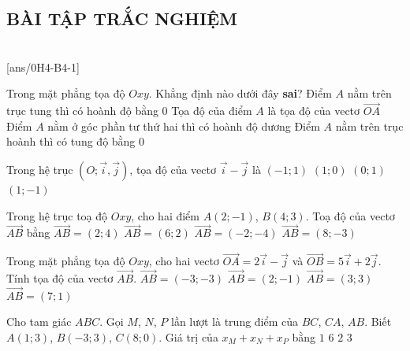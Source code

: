 \subsection{BÀI TẬP TRẮC NGHIỆM}
 \\
\setcounter{ex}{0}
[ans/0H4-B4-1]

\begin{ex}%
	Trong mặt phẳng tọa độ $Oxy$. Khẳng định nào dưới đây \textbf{sai}?
	\choice
	{Điểm $A$ nằm trên trục tung thì có hoành độ bằng 0}
	{Tọa độ của điểm $A$ là tọa độ của vectơ $\overrightarrow{OA}$}
	{\True Điểm $A$ nằm ở góc phần tư thứ hai thì có hoành độ dương}
	{Điểm $A$ nằm trên trục hoành thì có tung độ bằng 0}
\end{ex}

\begin{ex}%
	Trong hệ trục $(O; \overrightarrow{i}, \overrightarrow{j})$, tọa độ của vectơ $\overrightarrow{i} -\overrightarrow{j}$ là
	\choice
	{$(-1;1)$}
	{$(1;0)$}
	{$(0;1)$}
	{\True $(1;-1)$}
\end{ex}

\begin{ex}%
	Trong hệ trục toạ độ $Oxy$, cho hai điểm $A(2;-1)$, $B(4;3)$. Toạ độ của vectơ $\overrightarrow{AB}$ bằng
	\choice
	{\True $\overrightarrow{AB}=(2;4)$}
	{$\overrightarrow{AB}=(6;2)$}
	{$\overrightarrow{AB}=(-2;-4)$}
	{$\overrightarrow{AB}=(8;-3)$}
\end{ex}

\begin{ex}%
	Trong mặt phẳng tọa độ $Oxy$, cho hai vectơ $\overrightarrow{OA} =2\overrightarrow{i} -\overrightarrow{j}$ và $\overrightarrow{OB} =5\overrightarrow{i} +2\overrightarrow{j}$. Tính tọa độ của vectơ $\overrightarrow{AB}$.
	\choice
	{$\overrightarrow{AB} =(-3;-3) $}
	{$\overrightarrow{AB} =(2;-1) $}
	{\True $\overrightarrow{AB} =(3;3)$}
	{$\overrightarrow{AB} =(7;1)$}
\end{ex}

\begin{ex}%
	Cho tam giác $ABC$. Gọi $M$, $N$, $P$ lần lượt là trung điểm của $BC$, $CA$, $AB$. Biết $A(1;3)$, $B(-3;3)$, $C(8;0)$. Giá trị của $x_M+x_N+x_P$ bằng
	\choice
	{$1$}
	{\True $6$}
	{$2$}
	{$3$}
\end{ex}

